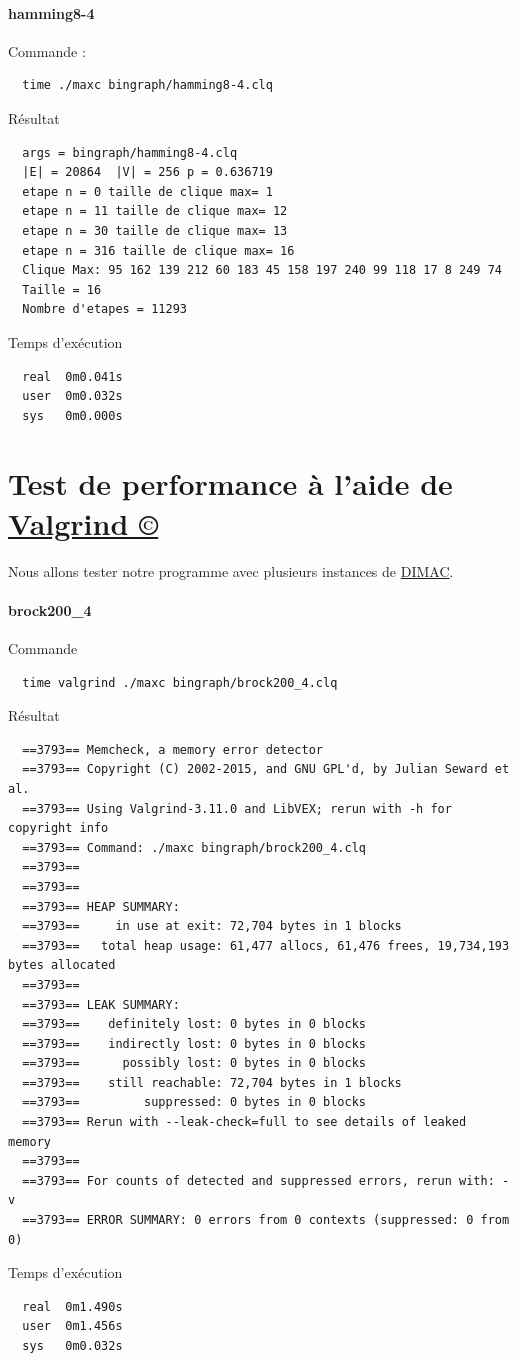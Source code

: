 \documentclass{article}
\begin{document}
\paragraph{hamming8-4}
Commande :
\begin{verbatim}
  time ./maxc bingraph/hamming8-4.clq
\end{verbatim}
Résultat
\begin{verbatim}
  args = bingraph/hamming8-4.clq
  |E| = 20864  |V| = 256 p = 0.636719
  etape n = 0 taille de clique max= 1
  etape n = 11 taille de clique max= 12
  etape n = 30 taille de clique max= 13
  etape n = 316 taille de clique max= 16
  Clique Max: 95 162 139 212 60 183 45 158 197 240 99 118 17 8 249 74
  Taille = 16
  Nombre d'etapes = 11293
\end{verbatim}
Temps d'exécution
\begin{verbatim}
  real  0m0.041s
  user  0m0.032s
  sys   0m0.000s

\end{verbatim}
\section{Test de performance à l'aide de \href{http://www.valgrind.org/}{Valgrind ©}}
Nous allons tester notre programme avec plusieurs instances de \href{https://turing.cs.hbg.psu.edu/txn131/clique.html}{DIMAC}.\\
\paragraph{brock200\_4}
Commande
\begin{verbatim}
  time valgrind ./maxc bingraph/brock200_4.clq
\end{verbatim}
Résultat
\begin{verbatim}
  ==3793== Memcheck, a memory error detector
  ==3793== Copyright (C) 2002-2015, and GNU GPL'd, by Julian Seward et al.
  ==3793== Using Valgrind-3.11.0 and LibVEX; rerun with -h for copyright info
  ==3793== Command: ./maxc bingraph/brock200_4.clq
  ==3793==
  ==3793==
  ==3793== HEAP SUMMARY:
  ==3793==     in use at exit: 72,704 bytes in 1 blocks
  ==3793==   total heap usage: 61,477 allocs, 61,476 frees, 19,734,193 bytes allocated
  ==3793==
  ==3793== LEAK SUMMARY:
  ==3793==    definitely lost: 0 bytes in 0 blocks
  ==3793==    indirectly lost: 0 bytes in 0 blocks
  ==3793==      possibly lost: 0 bytes in 0 blocks
  ==3793==    still reachable: 72,704 bytes in 1 blocks
  ==3793==         suppressed: 0 bytes in 0 blocks
  ==3793== Rerun with --leak-check=full to see details of leaked memory
  ==3793==
  ==3793== For counts of detected and suppressed errors, rerun with: -v
  ==3793== ERROR SUMMARY: 0 errors from 0 contexts (suppressed: 0 from 0)

\end{verbatim}
Temps d'exécution
\begin{verbatim}
  real  0m1.490s
  user  0m1.456s
  sys   0m0.032s
\end{verbatim}
\end{document}
